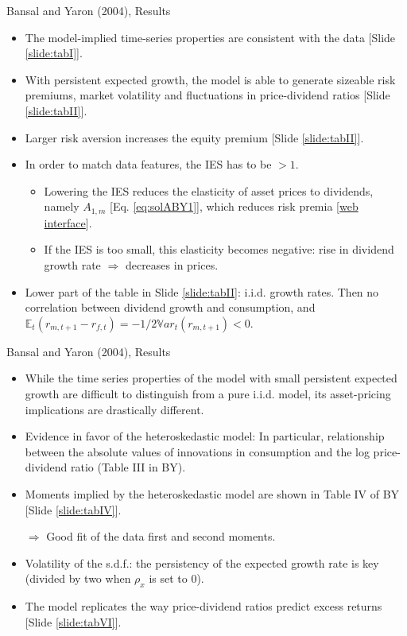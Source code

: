 \begin{frame}{Bansal and Yaron (2004), Results}
\begin{footnotesize}
\begin{itemize}
	\item The model-implied time-series properties are consistent with the data [Slide \ref{slide:tabI}].%
	
	\item With persistent expected growth, the model is able to generate sizeable risk premiums, market volatility and fluctuations in price-dividend ratios [Slide \ref{slide:tabII}].
	\item Larger risk aversion increases the equity premium  [Slide \ref{slide:tabII}].
	\item In order to match data features, the IES has to be $>1$.
	\begin{itemize}
		\item 	Lowering the IES reduces the elasticity of asset prices to dividends, namely $A_{1,m}$ [Eq. \ref{eq:solABY1}], which reduces risk premia [\href{https://jrenne.shinyapps.io/LRRModels}{web interface}].
		\item If the IES is too small, this elasticity becomes negative: rise in dividend growth rate $\Rightarrow$ decreases in prices.
	\end{itemize}
	\item Lower part of the table in Slide \ref{slide:tabII}: i.i.d. growth rates. Then no correlation between dividend growth and consumption, and $\mathbb{E}_t(r_{m,t+1}-r_{f,t})=-1/2 \mathbb{V}ar_t(r_{m,t+1}) < 0$.
\end{itemize}
\end{footnotesize}
\end{frame}

\begin{frame}{Bansal and Yaron (2004), Results}
\begin{footnotesize}
\begin{itemize}
	\item While the time series properties of the model with small persistent expected growth are difficult to distinguish from a pure i.i.d. model, its asset-pricing implications are drastically different.
	\item Evidence in favor of the heteroskedastic model: In particular, relationship between the absolute values of innovations in consumption and the log price-dividend ratio (Table III in BY).
	\item Moments implied by the heteroskedastic model are shown in Table IV of BY [Slide \ref{slide:tabIV}].
	\item[$\Rightarrow$] Good fit of the data first and second moments.
	\item Volatility of the s.d.f.: the persistency of the expected growth rate is key (divided by two when $\rho_x$ is set to 0).
	\item The model replicates the way price-dividend ratios predict excess returns [Slide \ref{slide:tabVI}].
\end{itemize}
\end{footnotesize}
\end{frame}


